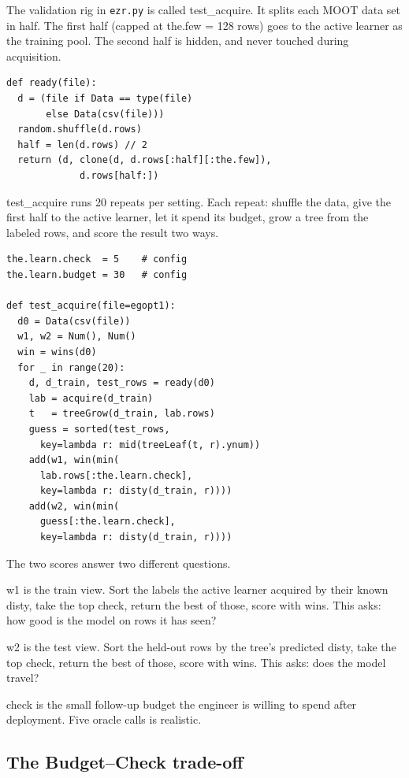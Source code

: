 \documentclass[AMA,STIX2COL]{WileyNJDv5}
\begin{document}
The validation rig in \texttt{ezr.py} is called
\textsf{test\_acquire}. It splits each MOOT data set in half.
The first half (capped at \textsf{the.few} = 128 rows) goes to
the active learner as the training pool. The second half is
hidden, and never touched during acquisition.

\begin{verbatim}
def ready(file):
  d = (file if Data == type(file)
       else Data(csv(file)))
  random.shuffle(d.rows)
  half = len(d.rows) // 2
  return (d, clone(d, d.rows[:half][:the.few]),
             d.rows[half:])
\end{verbatim}

\textsf{test\_acquire} runs 20 repeats per setting. Each repeat:
shuffle the data, give the first half to the active learner,
let it spend its budget, grow a tree from the labeled rows, and
score the result two ways.

\begin{verbatim}
the.learn.check  = 5    # config
the.learn.budget = 30   # config

def test_acquire(file=egopt1):
  d0 = Data(csv(file))
  w1, w2 = Num(), Num()
  win = wins(d0)
  for _ in range(20):
    d, d_train, test_rows = ready(d0)
    lab = acquire(d_train)
    t   = treeGrow(d_train, lab.rows)
    guess = sorted(test_rows,
      key=lambda r: mid(treeLeaf(t, r).ynum))
    add(w1, win(min(
      lab.rows[:the.learn.check],
      key=lambda r: disty(d_train, r))))
    add(w2, win(min(
      guess[:the.learn.check],
      key=lambda r: disty(d_train, r))))
\end{verbatim}

The two scores answer two different questions.

\textsf{w1} is the train view. Sort the labels the active
learner acquired by their known \textsf{disty}, take the top
\textsf{check}, return the best of those, score with
\textsf{wins}. This asks: how good is the model on rows it has
seen?

\textsf{w2} is the test view. Sort the held-out rows by the tree's
predicted \textsf{disty}, take the top \textsf{check}, return
the best of those, score with \textsf{wins}. This asks: does the
model travel?

\textsf{check} is the small follow-up budget the engineer is
willing to spend after deployment. Five oracle calls is realistic.

\subsection{The Budget--Check trade-off}
\end{document}
